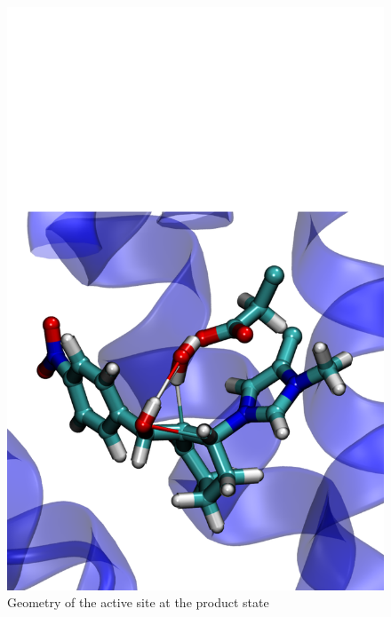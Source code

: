 \documentclass[%
preprint,
 amsmath,amssymb,
 aps,
prb,
]{revtex4-2}
\begin{document}
\begin{figure}[ht!]
\begin{minipage}[b]{.4\textwidth}
\includegraphics[scale=0.27]{figures/prod-61.pdf}
\caption{Geometry of the active site at the product state}\label{fig:prod61}
\end{minipage}
\end{figure}
\end{document}
